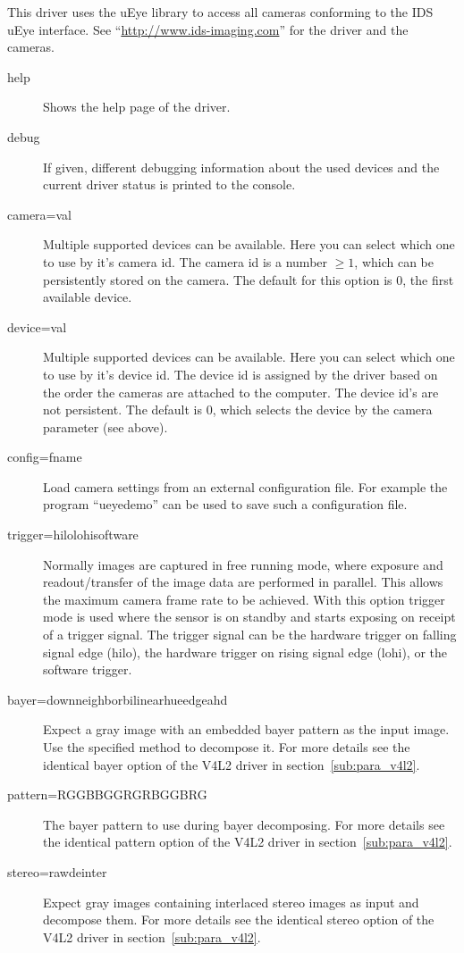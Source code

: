 This driver uses the uEye library to access all cameras
conforming to the IDS uEye interface. See
``\url{http://www.ids-imaging.com}'' for the driver and the
cameras.
\begin{description}
\item[help] Shows the help page of the driver.
\item[debug] If given, different debugging information about the
  used devices and the current driver status is printed to the
  console.
\item[camera=val] Multiple supported devices can be available. Here
  you can select which one to use by it's camera id. The camera id
  is a number $\ge 1$, which can be persistently stored on the
  camera. The default for this option is 0, the first available
  device.
\item[device=val] Multiple supported devices can be available. Here
  you can select which one to use by it's device id. The device id
  is assigned by the driver based on the order the cameras are
  attached to the computer. The device id's are not persistent. The
  default is 0, which selects the device by the camera parameter
  (see above).
\item[config=fname] Load camera settings from an external
  configuration file. For example the program ``ueyedemo'' can be
  used to save such a configuration file.
\item[trigger=hilo\textbar{}lohi\textbar{}software]
  Normally images are captured in free running mode, where exposure
  and readout/transfer of the image data are performed in
  parallel. This allows the maximum camera frame rate to be
  achieved. With this option trigger mode is used where the sensor
  is on standby and starts exposing on receipt of a trigger
  signal. The trigger signal can be the hardware trigger on falling
  signal edge (hilo), the hardware trigger on rising signal edge
  (lohi), or the software trigger.
\item[bayer=down\textbar{}neighbor\textbar{}bilinear\textbar{}hue\textbar{}edge\textbar{}ahd]
  Expect a gray image with an embedded bayer pattern as the input
  image. Use the specified method to decompose it. For more details
  see the identical bayer option of the V4L2 driver in
  section~\ref{sub:para_v4l2}.
\item[pattern=RGGB\textbar{}BGGR\textbar{}GRBG\textbar{}GBRG]
  The bayer pattern to use during bayer decomposing. For more
  details see the identical pattern option of the V4L2 driver in
  section~\ref{sub:para_v4l2}.
\item[stereo=raw\textbar{}deinter] Expect gray images containing
  interlaced stereo images as input and decompose them. For more
  details see the identical stereo option of the V4L2 driver in
  section~\ref{sub:para_v4l2}.
\end{description}

